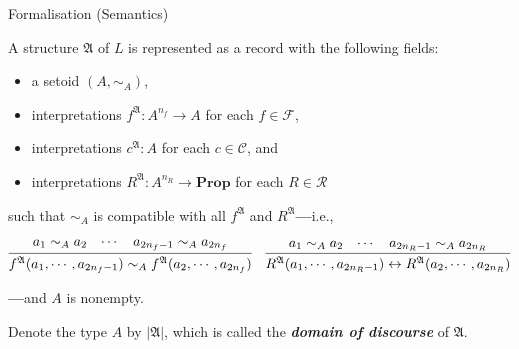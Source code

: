 \documentclass[serif,table,10pt]{beamer}
\newcommand{\0}{\texttt{0}}
\newcommand{\1}{\texttt{1}}
\newcommand{\inlinedef}[1]{\emph{\textbf{#1}}}
\newcommand{\Prop}{\mathbf{Prop}}
\begin{document}
\begin{frame}{Formalisation (Semantics)}

    A structure $\mathfrak{A}$ of $L$ is represented as a record with the following fields:
    \begin{itemize}
        \item a setoid $( A , \sim_A )$,
        \item interpretations $ f^\mathfrak{A} : A^{n_f} \to A $ for each $f \in \mathcal{F}$,
        \item interpretations $ c^\mathfrak{A} : A $ for each $c \in \mathcal{C}$, and
        \item interpretations $ R^\mathfrak{A} : A^{n_R} \to \Prop $ for each $R \in \mathcal{R}$
    \end{itemize}
    such that $\sim_A$ is compatible with all $f^\mathfrak{A}$ and $R^\mathfrak{A}$\textbf{---}i.e.,
    \begin{center} \small
        $ \infer{f^\mathfrak{A} (a_1 , \cdots , a_{2 n_f - 1}) \sim_A f^\mathfrak{A} (a_2 , \cdots , a_{2 n_f} )}{a_1 \sim_A a_2 & \cdots & a_{2 n_f - 1} \sim_A a_{2 n_f}} \quad \infer{R^\mathfrak{A} (a_1 , \cdots , a_{2 n_R - 1}) \leftrightarrow R^\mathfrak{A} (a_2 , \cdots , a_{2 n_R} )}{a_1 \sim_A a_2 & \cdots & a_{2 n_R - 1} \sim_A a_{2 n_R}} $
    \end{center}
    \textbf{---}and $A$ is nonempty.

    Denote the type $A$ by $| \mathfrak{A} |$, which is called the \inlinedef{domain of discourse} of $\mathfrak{A}$.

\end{frame}
\end{document}
